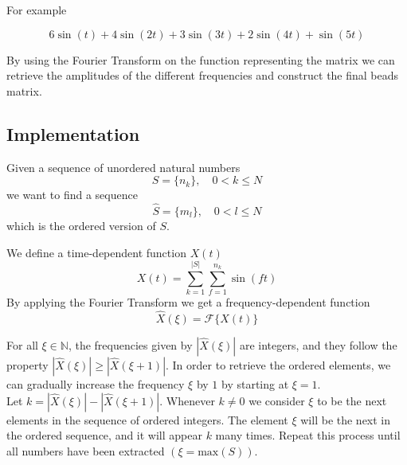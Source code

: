 \documentclass{article}
\begin{document}
For example

\begin{minipage}{0.3\textwidth}
    \begin{flushright}        
    \end{flushright}
\end{minipage}
\begin{minipage}{0.5\textwidth}
    \[
        6\sin(t) + 4\sin(2t) + 3\sin(3t) + 2\sin(4t)+\sin(5t)
    \]
\end{minipage}

By using the Fourier Transform on the function representing the matrix
we can retrieve the amplitudes of the different frequencies
and construct the final beads matrix.

\subsection{Implementation}

Given a sequence of unordered natural numbers
\[
    S=\{n_k\},
    \quad
    0 < k \leq N
\]
we want to find a sequence
\[
    \hat{S}=\{m_l\},
    \quad
    0 < l \leq N
\]
which is the ordered version of \(S\).

We define a time-dependent function \(X(t)\)
\[
    X(t)=
    \sum_{k=1}^{|S|}
    \sum_{f=1}^{n_k}
    \sin(ft)
\]
By applying the Fourier Transform we get a frequency-dependent function
\[
    \hat{X}(\xi)=\mathcal{F}\{X(t)\}
\]

For all \(\xi \in \mathbb{N}\), the frequencies given by
\(|\hat{X}(\xi)|\) are integers, and they follow the property
\(|\hat{X}(\xi)| \geq |\hat{X}(\xi+1)|\).
In order to retrieve the ordered elements, we can gradually increase
the frequency \(\xi\) by \(1\) by starting at \(\xi=1\). \\
Let \(k=|\hat{X}(\xi)| - |\hat{X}(\xi+1)|\). Whenever \(k \neq 0\)
we consider \(\xi\) to be the next elements in the sequence of ordered
integers. The element \(\xi\) will be the next in the ordered sequence,
and it will appear \(k\) many times.
Repeat this process until all numbers have been extracted
\((\xi = \text{max}(S))\).
\end{document}
